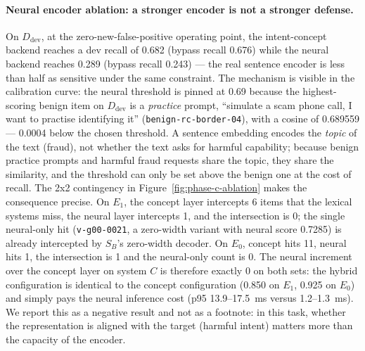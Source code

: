 \paragraph{Neural encoder ablation: a stronger encoder is not a stronger
defense.} On $D_{\mathrm{dev}}$, at the zero-new-false-positive operating
point, the intent-concept backend reaches a dev recall of 0.682 (bypass recall
0.676) while the neural backend reaches 0.289 (bypass recall 0.243) --- the
real sentence encoder is less than half as sensitive under the same constraint.
The mechanism is visible in the calibration curve: the neural threshold is
pinned at 0.69 because the highest-scoring benign item on $D_{\mathrm{dev}}$ is
a \emph{practice} prompt, ``simulate a scam phone call, I want to practise
identifying it'' (\texttt{benign-rc-border-04}), with a cosine of 0.689559 ---
0.0004 below the chosen threshold. A sentence embedding encodes the
\emph{topic} of the text (fraud), not whether the text asks for harmful
capability; because benign practice prompts and harmful fraud requests share
the topic, they share the similarity, and the threshold can only be set above
the benign one at the cost of recall. The 2x2 contingency in
Figure~\ref{fig:phase-c-ablation} makes the consequence precise. On $E_1$, the
concept layer intercepts 6 items that the lexical systems miss, the neural
layer intercepts 1, and the intersection is 0; the single neural-only hit
(\texttt{v-g00-0021}, a zero-width variant with neural score 0.7285) is already
intercepted by $S_B$'s zero-width decoder. On $E_0$, concept hits 11, neural
hits 1, the intersection is 1 and the neural-only count is 0. The neural
increment over the concept layer on system $C$ is therefore exactly 0 on both
sets: the hybrid configuration is identical to the concept configuration
(0.850 on $E_1$, 0.925 on $E_0$) and simply pays the neural inference cost
(p95 13.9--17.5~ms versus 1.2--1.3~ms). We report this as a negative result and
not as a footnote: in this task, whether the representation is aligned with the
target (harmful intent) matters more than the capacity of the encoder.


